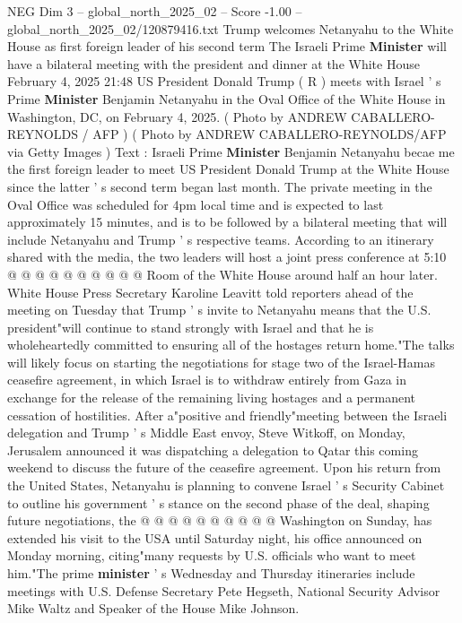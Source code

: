 \begin{textsample}{NEG Dim 3 – global\_north\_2025\_02 – Score -1.00 – global\_north\_2025\_02/120879416.txt}  \label{ex:f3_neg_170}
Trump welcomes Netanyahu to the White House as first foreign leader of his second term The Israeli Prime \textbf{Minister} will have a bilateral meeting with the president and dinner at the White House February 4, 2025 21:48 US President Donald Trump ( R ) meets with Israel ' s Prime \textbf{Minister} Benjamin Netanyahu in the Oval Office of the White House in Washington, DC, on February 4, 2025. ( Photo by ANDREW CABALLERO-REYNOLDS / AFP ) ( Photo by ANDREW CABALLERO-REYNOLDS/AFP via Getty Images ) Text : Israeli Prime \textbf{Minister} Benjamin Netanyahu becae me the first foreign leader to meet US President Donald Trump at the White House since the latter ' s second term began last month.
The private meeting in the Oval Office was scheduled for 4pm local time and is expected to last approximately 15 minutes, and is to be followed by a bilateral meeting that will include Netanyahu and Trump ' s respective teams.
According to an itinerary shared with the media, the two leaders will host a joint press conference at 5:10 @ @ @ @ @ @ @ @ @ @ Room of the White House around half an hour later.
White House Press Secretary Karoline Leavitt told reporters ahead of the meeting on Tuesday that Trump ' s invite to Netanyahu means that the U.S. president"will continue to stand strongly with Israel and that he is wholeheartedly committed to ensuring all of the hostages return home."The talks will likely focus on starting the negotiations for stage two of the Israel-Hamas ceasefire agreement, in which Israel is to withdraw entirely from Gaza in exchange for the release of the remaining living hostages and a permanent cessation of hostilities.
After a"positive and friendly"meeting between the Israeli delegation and Trump ' s Middle East envoy, Steve Witkoff, on Monday, Jerusalem announced it was dispatching a delegation to Qatar this coming weekend to discuss the future of the ceasefire agreement.
Upon his return from the United States, Netanyahu is planning to convene Israel ' s Security Cabinet to outline his government ' s stance on the second phase of the deal, shaping future negotiations, the @ @ @ @ @ @ @ @ @ @ Washington on Sunday, has extended his visit to the USA until Saturday night, his office announced on Monday morning, citing"many requests by U.S. officials who want to meet him."The prime \textbf{minister} ' s Wednesday and Thursday itineraries include meetings with U.S.
Defense Secretary Pete Hegseth, National Security Advisor Mike Waltz and Speaker of the House Mike Johnson.

\end{textsample}
